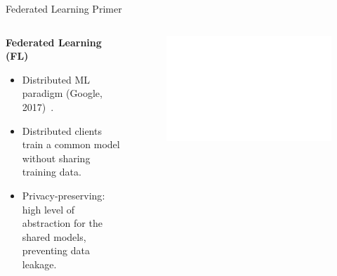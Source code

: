 \begin{frame}{Federated Learning Primer}

  \begin{columns}
    \begin{column}{0.4\textwidth}
      \textbf{Federated Learning (FL)}
      \small
      \begin{itemize}[<+->]
        \item Distributed ML paradigm (Google, 2017)~\autocite{mcmahan_Communicationefficientlearningdeep_2017}.
        \item Distributed clients  train a common model without sharing training data.
        \item \alert{Privacy-preserving}: high level of abstraction for the shared models, preventing data leakage.
      \end{itemize}
    \end{column}
    
    \begin{column}{0.6\textwidth}
      \begin{figure}
        \centering
        \includegraphics[width=1.1\linewidth,right]{figures/intro/fl.drawio.pdf}
      \end{figure}
    \end{column}
  \end{columns}

\end{frame}

